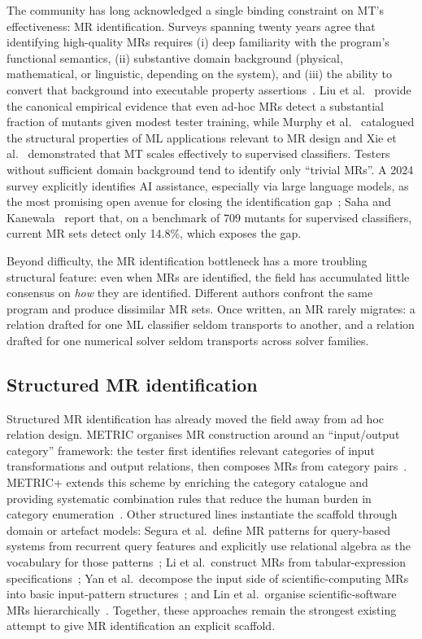 \documentclass[manuscript]{acmart}
\begin{document}
The community has long acknowledged a single binding constraint on MT's effectiveness: MR identification. Surveys spanning twenty years agree that identifying high-quality MRs requires (i) deep familiarity with the program's functional semantics, (ii) substantive domain background (physical, mathematical, or linguistic, depending on the system), and (iii) the ability to convert that background into executable property assertions~\cite{Segura2016, LiTOSEM2025}. Liu et al.~\cite{Liu2014MTEffectiveness} provide the canonical empirical evidence that even ad-hoc MRs detect a substantial fraction of mutants given modest tester training, while Murphy et al.~\cite{Murphy2008} catalogued the structural properties of ML applications relevant to MR design and Xie et al.~\cite{Xie2011} demonstrated that MT scales effectively to supervised classifiers. Testers without sufficient domain background tend to identify only ``trivial MRs''. A 2024 survey explicitly identifies AI assistance, especially via large language models, as the most promising open avenue for closing the identification gap~\cite{LiTOSEM2025}; Saha and Kanewala~\cite{Saha2019SupervisedMR} report that, on a benchmark of 709 mutants for supervised classifiers, current MR sets detect only 14.8\%, which exposes the gap.

Beyond difficulty, the MR identification bottleneck has a more troubling structural feature: even when MRs are identified, the field has accumulated little consensus on \emph{how} they are identified. Different authors confront the same program and produce dissimilar MR sets. Once written, an MR rarely migrates: a relation drafted for one ML classifier seldom transports to another, and a relation drafted for one numerical solver seldom transports across solver families.

\subsection{Structured MR identification}

Structured MR identification has already moved the field away from ad hoc relation design. METRIC organises MR construction around an ``input/output category'' framework: the tester first identifies relevant categories of input transformations and output relations, then composes MRs from category pairs~\cite{ChenMETRIC2016}. METRIC+ extends this scheme by enriching the category catalogue and providing systematic combination rules that reduce the human burden in category enumeration~\cite{SunMETRICplus2021}. Other structured lines instantiate the scaffold through domain or artefact models: Segura et al.\ define MR patterns for query-based systems from recurrent query features and explicitly use relational algebra as the vocabulary for those patterns~\cite{Segura2019QBSMRPatterns}; Li et al.\ construct MRs from tabular-expression specifications~\cite{Li2020TabularMR}; Yan et al.\ decompose the input side of scientific-computing MRs into basic input-pattern structures~\cite{Yan2022InputPattern}; and Lin et al.\ organise scientific-software MRs hierarchically~\cite{Lin2018HierarchicalMR}. Together, these approaches remain the strongest existing attempt to give MR identification an explicit scaffold.
\end{document}
